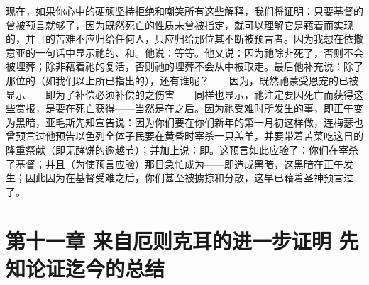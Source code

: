 现在，如果你心中的硬顽坚持拒绝和嘲笑所有这些解释，我们将证明：只要基督的曾被预言就够了，因为既然死亡的性质未曾被指定，就可以理解它是藉着而实现的，并且的苦难不应归给任何人，只应归给那位其不断被预言者。因为我想在依撒意亚的一句话中显示祂的、和。他说：等等。他又说：因为祂除非死了，否则不会被埋葬；除非藉着祂的复活，否则祂的埋葬不会从中被取走。最后他补充说：除了那位的（如我们以上所已指出的），还有谁呢？——因为，既然祂蒙受恩宠的已被显示——即为了补偿必须补偿的之伤害——同样也显示，祂注定要因死亡而获得这些赏报，是要在死亡获得——当然是在之后。因为祂受难时所发生的事，即正午变为黑暗，亚毛斯先知宣告说：因为你们要在你们新年的第一月初这样做，连梅瑟也曾预言过他预告以色列全体子民要在黄昏时宰杀一只羔羊，并要带着苦菜吃这日的隆重祭献（即无酵饼的逾越节）；并加上说：即。这预言如此应验了：你们在宰杀了基督；并且（为使预言应验）那日急忙成为——即造成黑暗，这黑暗在正午发生；因此因为在基督受难之后，你们甚至被掳掠和分散，这早已藉着圣神预言过了。\par


\section{第十一章 来自厄则克耳的进一步证明 先知论证迄今的总结}


